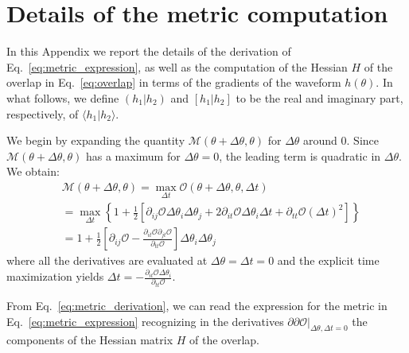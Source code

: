 \documentclass[twocolumn,showpacs,preprintnumbers,nofootinbib,prd,
superscriptaddress,10pt]{revtex4-2}
\newcommand{\scalar}[2]{\langle #1|#2 \rangle}
\newcommand{\rescalar}[2]{( #1 |#2 )}
\newcommand{\imscalar}[2]{[ #1|#2 ]}
\begin{document}
\appendix

\section{Details of the metric computation}\label{app:metric}

In this Appendix we report the details of the derivation of Eq.~\eqref{eq:metric_expression}, as well as the computation of the Hessian $H$ of the overlap in Eq.~\eqref{eq:overlap} in terms of the gradients of the waveform $h(\theta)$. 
In what follows, we define $\rescalar{h_1}{h_2}$ and $\imscalar{h_1}{h_2}$ to be the real and imaginary part, respectively, of $\scalar{h_1}{h_2}$.

We begin by expanding the quantity $\mathcal{M}(\theta+\Delta\theta,\theta )$ for $\Delta\theta$ around $0$. Since $\mathcal{M}(\theta+\Delta\theta,\theta )$ has a maximum for $\Delta\theta = 0$, the leading term is quadratic in $\Delta\theta$.
We obtain:
\begin{align} \label{eq:metric_derivation}
	&\mathcal{M}(\theta+\Delta\theta,\theta ) = \max_{\Delta t} \mathcal{O}(\theta + \Delta\theta, \theta, \Delta t) \nonumber\\
	& =	\max_{\Delta t} \left\{ 1+ \frac{1}{2}\left[ \partial_{ij}\mathcal{O} \Delta\theta_i \Delta\theta_j + 2  \partial_{it}\mathcal{O} \Delta\theta_i \Delta t + \partial_{tt}\mathcal{O} (\Delta t)^2 \right] \right\}  \nonumber \\
	&= 1 + \frac{1}{2}\left[ \partial_{ij}\mathcal{O} - \frac{\partial_{it}\mathcal{O} \partial_{jt}\mathcal{O}}{\partial_{tt}\mathcal{O}}\right] \Delta\theta_i \Delta\theta_j
\end{align}
where all the derivatives are evaluated at ${\Delta\theta = \Delta t = 0}$ and the explicit time maximization yields
${\Delta t = -\frac{\partial_{it}\mathcal{O} \Delta\theta_i}{\partial_{tt}\mathcal{O}}}$.

From Eq.~\eqref{eq:metric_derivation}, we can read the expression for the metric in Eq.~\eqref{eq:metric_expression} recognizing in the derivatives $\partial\partial\mathcal{O}|_{\Delta\theta, \Delta t = 0}$ the components of the Hessian matrix $H$ of the overlap.
\end{document}
